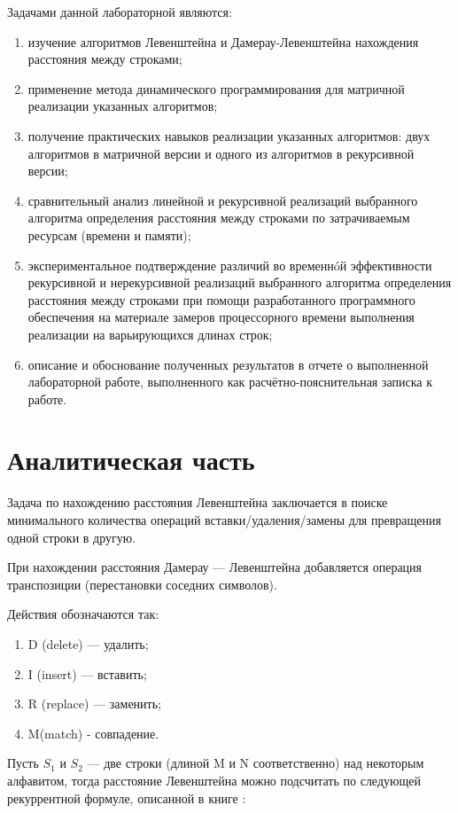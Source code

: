 \documentclass[12pt,a4paper,oneside]{report}
\begin{document}
Задачами данной лабораторной являются:
\begin{enumerate}
	\item изучение алгоритмов Левенштейна и Дамерау-Левенштейна нахождения расстояния между строками;
	\item применение метода динамического программирования для матричной реализации указанных алгоритмов; 
	\item получение практических навыков реализации указанных алгоритмов: двух алгоритмов в матричной версии и одного из алгоритмов в рекурсивной версии; 
	\item сравнительный анализ линейной и рекурсивной реализаций выбранного алгоритма определения расстояния между строками по затрачиваемым ресурсам (времени и памяти); 
	\item экспериментальное подтверждение различий во временнóй эффективности рекурсивной и
	нерекурсивной реализаций выбранного алгоритма определения расстояния между строками при
	помощи разработанного программного обеспечения на материале замеров процессорного времени
	выполнения реализации на варьирующихся длинах строк; 
	\item описание и обоснование полученных результатов в отчете о выполненной лабораторной
	работе, выполненного как расчётно-пояснительная записка к работе. 
\end{enumerate}

\chapter{Аналитическая часть}
\qquad Задача по нахождению расстояния Левенштейна заключается в поиске минимального количества операций вставки/удаления/замены для превращения одной строки в другую.

При нахождении расстояния Дамерау — Левенштейна добавляется операция транспозиции (перестановки соседних символов).  

Действия обозначаются так:
\begin{enumerate}
	\item D (delete) — удалить;
	\item I (insert) — вставить;
	\item R (replace) — заменить;
	\item M(match) - совпадение.
\end{enumerate}

Пусть $S_{1}$ и $S_{2}$ — две строки (длиной M и N соответственно) над некоторым алфавитом, тогда расстояние Левенштейна можно подсчитать по следующей рекуррентной формуле, описанной в книге \cite{Skieyna}:
\end{document}
